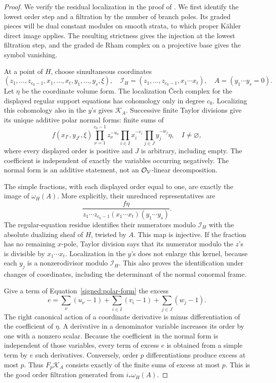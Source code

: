 \begin{proof}
We verify the residual localization in the proof of
\cite[Proposition~11.1]{BL}.  We first identify the lowest order step and
a filtration by the number of branch poles.  Its graded pieces will be
dual constant modules on smooth strata, to which proper Kähler direct
image applies.  The resulting strictness gives the injection at the lowest
filtration step,
and the graded de Rham complex on a projective base gives the symbol
vanishing.

At a point of \(H\), choose
simultaneous coordinates
\[
 (z_1,\ldots,z_{c_0-1},x_1,\ldots,x_t,y_1,\ldots,y_s,\xi),
 \quad
 \mathscr I_H=(z_1,\ldots,z_{c_0-1},x_1\cdots x_t),
 \quad A=(y_1\cdots y_s=0).
\]
Let \(\eta\) be the coordinate volume form.  The localization
Čech complex for the displayed regular support equations has
cohomology only in degree \(c_0\).  Localizing this cohomology
also in the \(y\)'s gives \(\mathcal K_A\).  Successive finite
Taylor divisions give its unique additive polar normal forms:
finite sums of
\begin{equation}\label{signed:polar-form}
 f(x_{I^c},y_{J^c},\xi)
 \prod_{\nu=1}^{c_0-1}z_\nu^{-u_\nu}
 \prod_{i\in I}x_i^{-v_i}
 \prod_{j\in J}y_j^{-w_j}\eta,
 \quad I\ne\varnothing,
\end{equation}
where every displayed order is positive and \(J\) is arbitrary,
including empty.  The coefficient is independent of exactly
the variables occurring negatively.  The normal form is an
additive statement, not an \(\mathcal O_{\mathcal{V}}\)-linear
decomposition.

The simple fractions, with each displayed order equal to one,
are exactly the image of \(\omega_H(A)\).  More explicitly,
their unreduced representatives are
\[
 \frac{f\eta}
 {z_1\cdots z_{c_0-1}(x_1\cdots x_t)(y_1\cdots y_s)}.
\]
The regular-equation residue identifies their numerators modulo
\(\mathscr I_H\) with the absolute dualizing sheaf of \(H\),
twisted by \(A\).  This map is injective.  If the fraction has
no remaining \(x\)-pole, Taylor division says that its
numerator modulo the \(z\)'s is divisible by \(x_1\cdots x_t\).
Localization in the \(y\)'s does not enlarge this kernel,
because each \(y_j\) is a nonzerodivisor modulo
\(\mathscr I_H\).  This also proves the identification under
changes of coordinates, including the determinant of the
normal conormal frame.

Give a term of Equation~\eqref{signed:polar-form} the excess
\[
 e=\sum_\nu(u_\nu-1)+\sum_{i\in I}(v_i-1)
                   +\sum_{j\in J}(w_j-1).
\]
The right canonical action of a coordinate derivative is minus
differentiation of the coefficient of \(\eta\).  A derivative
in a denominator variable increases its order by one with a
nonzero scalar.  Because the coefficient in the normal form
is independent of those variables, every term of excess
\(e\) is obtained from a simple term by \(e\) such derivatives.
Conversely, order \(p\) differentiations produce excess at
most \(p\).  Thus \(F_p\mathcal K_A\) consists exactly of the
finite sums of excess at most \(p\).  This is the good order
filtration generated from \(i_*\omega_H(A)\).


\end{proof}
